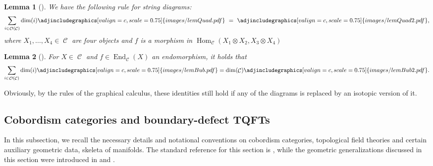 \documentclass[10pt,a4paper]{amsart}
\DeclareMathOperator{\End}{End}
\DeclareMathOperator{\Hom}{Hom}
\DeclareMathOperator{\calc}{\mathcal{C}}
\DeclareMathOperator{\calo}{\mathcal{O}}
\numberwithin{equation}{section}
\newtheorem{Lemma}[Lemma]{Lemma}
\theoremstyle{definition}
\begin{document}
\begin{Lemma}[{\cite[Lemma~7]{FS}}]\label{lemQuad}
 We have the following rule for string diagrams:
 \begin{align*}
\sum_{i \in \calo(\calc)} \dim(i) \adjincludegraphics[valign=c, scale = 0.75]{images/lemQuad.pdf} \, \, = \, \, \adjincludegraphics[valign=c, scale = 0.75]{images/lemQuad2.pdf},
 \end{align*}
where ${X_1, \dots, X_4 \in \calc}$ are four objects and $f$ is a morphism in $\Hom_{\calc}(X_1 \otimes X_2, X_3 \otimes X_4)$
\end{Lemma}

\begin{Lemma}[{\cite[Lemma 8]{FS}}]\label{lemBub}
For $X \in \calc$ and $f \in \End_{\calc}(X)$ an endomorphism, it holds that
 \begin{align*}
\sum_{i \in \calo(\calc)} \dim(i) \adjincludegraphics[valign=c, scale = 0.75]{images/lemBub.pdf} =   \dim(\calc) \adjincludegraphics[valign=c, scale = 0.75]{images/lemBub2.pdf}.
 \end{align*}
\end{Lemma}
Obviously, by the rules of the graphical calculus, these identities still hold if any of the diagrams is replaced by an isotopic version of it.

\subsection{Cobordism categories and boundary-defect TQFTs}
\label{subSecTQFTs}
In this subsection, we recall the necessary details and notational conventions on cobordism categories, topological field theories and certain auxiliary geometric data, skeleta of manifolds. The standard reference for this section is \cite{TV}, while the geometric generalizations discussed in this section were introduced in \cite{F} and \cite{FS}.
\end{document}
